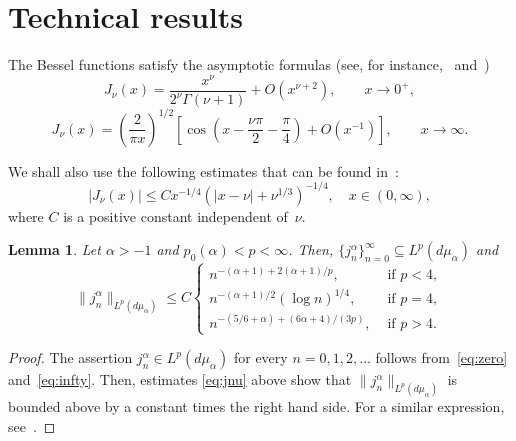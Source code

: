 \documentclass[11pt,a4paper]{amsart}
\newcommand{\mua}{d\mu_\alpha}
\newcommand{\jna}{j_n^{\alpha}}
\newcommand{\lpnorm}[3]{\|{#1}\|_{L^{#2}({#3})}} %
\theoremstyle{plain}
\newtheorem{lem}{Lemma}
\theoremstyle{remark}
\begin{document}
\section{Technical results}

The Bessel functions satisfy the asymptotic formulas
(see, for instance,~\cite[Ch.~III, 3.1 (8), p.~40]{Wat} and~\cite[Ch.~VII, 7.21 (1),
p.~199]{Wat})
\begin{equation}
\label{eq:zero}
  J_\nu(x) = \frac{x^\nu}{2^\nu \Gamma(\nu+1)} + O(x^{\nu+2}),
    \qquad x \to 0^+,
\end{equation}
\begin{equation}
\label{eq:infty}
  J_\nu(x) = \left(\frac{2}{\pi x}\right)^{1/2}\left[ \cos\left(x-\frac{\nu\pi}2
    - \frac\pi4 \right) + O(x^{-1}) \right], \qquad x \to \infty.
\end{equation}

We shall also use the following estimates that can be found in~\cite{CiGPV,V}:
\begin{equation}
\label{eq:jnu}
   |J_\nu(x)| \le C x^{-1/4} \left( |x - \nu| + \nu^{1/3} \right)^{-1/4},
   \quad x \in (0,\infty),
\end{equation}
where $C$ is a positive constant independent of~$\nu$. 

\begin{lem}
\label{lem:normajn}
Let $\alpha > -1$ and $p_0(\alpha)<p<\infty$.
Then, $\{\jna\}_{n=0}^\infty \subseteq L^p(\mua)$ and
\begin{equation*}
  \lpnorm{\jna}{p}{\mua} \le C
    \begin{cases}
      n^{-(\alpha+1) + 2(\alpha+1)/p},
      &\text{ if } p < 4, \\[2pt]
      n^{-(\alpha+1)/2} (\log n)^{1/4},
      &\text{ if } p = 4, \\[2pt]
      n^{-(5/6+\alpha) + (6\alpha + 4)/(3p)},
      &\text{ if } p > 4.
    \end{cases}
\end{equation*}
\end{lem}

\begin{proof}
The assertion $\jna \in L^p(\mua)$ for every $n=0,1,2,\dots$
follows from~\eqref{eq:zero} and~\eqref{eq:infty}. Then,
estimates \eqref{eq:jnu} above show that $\lpnorm{\jna}{p}{\mua}$ is bounded above by a constant times the right hand side. For a similar expression, see~\cite{St-Guo}.
\end{proof}
\end{document}
